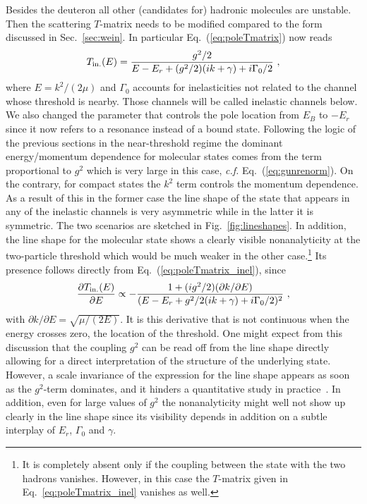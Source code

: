 Besides the deuteron all other (candidates for) hadronic molecules are unstable.
Then the scattering $T$-matrix needs to be modified compared to the form
discussed in Sec.~\ref{sec:wein}. In particular Eq.~(\ref{eq:poleTmatrix}) now
reads
\begin{equation}
T_{\rm in.}(E) = \frac{g^2/2}{E-E_r+(g^2/2)(i k+\gamma)+i\Gamma_0/2} \ ,
\label{eq:poleTmatrix_inel}
\end{equation}
where $E=k^2/(2\mu)$ and $\Gamma_0$ accounts for inelasticities not related
to the channel whose threshold is nearby. Those channels will be called
inelastic channels below.
We also changed the parameter that controls the pole location from $E_B$ to
$-E_r$ since it now refers to a resonance instead of a bound state.
Following the logic of the previous sections in the near-threshold regime the
dominant energy/momentum dependence for molecular states comes from the term
proportional to $g^2$ which is very large in this case, {\sl c.f.}
Eq.~(\ref{eq:gunrenorm}). On the contrary, for compact states the $k^2$ term
controls the momentum dependence. As a result of this in the former case the
line shape of the state that appears in any of the inelastic channels is very
asymmetric while in the latter it is symmetric. The two scenarios are sketched
in Fig.~\ref{fig:lineshapes}.
In addition, the line shape for the molecular state shows a clearly visible
nonanalyticity at the two-particle threshold which would be much weaker in the
other case.\footnote{It is completely absent only if the coupling between the
state with the two hadrons vanishes. However, in this case the $T$-matrix given
in Eq.~\eqref{eq:poleTmatrix_inel} vanishes as well.} Its presence follows 
directly from Eq.~(\ref{eq:poleTmatrix_inel}), since
\begin{equation}
\frac{\partial T_{\rm in.}(E)}{\partial E} \propto -\frac{1+(ig^2/2)(\partial k
/\partial E)}{(E-E_r+g^2/2(i k+\gamma)+i\Gamma_{0}/2)^2} \ ,
\end{equation}
with $\partial k/\partial E=\sqrt{\mu/(2E)}$. It is this derivative that is
not continuous when the energy crosses zero, the location of the threshold.
One might expect from this discussion that the coupling $g^2$ can be read off
from the line shape directly allowing for a direct interpretation of the
structure of the underlying state. However, a scale invariance of the expression
for the line shape appears as soon as the $g^2$-term dominates, and it
hinders a quantitative study in practice~\cite{Baru:2004xg}. In addition, even
for large values of  $g^2$ the nonanalyticity might well not show up clearly in 
the line shape since its visibility depends in addition on a subtle interplay 
of $E_r$, $\Gamma_0$ and $\gamma$.



